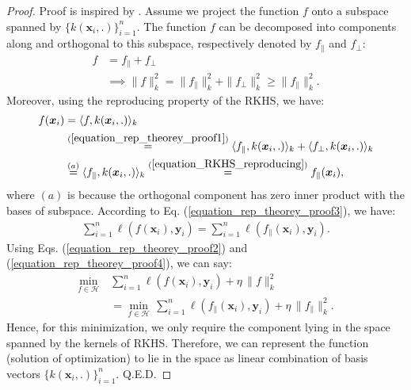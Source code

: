 \documentclass[lang=cn,10pt]{gorgeousnbook}
\numberwithin{equation}{section}%
\numberwithin{figure}{section}%
\begin{document}
\begin{proof}
Proof is inspired by \cite{rudin2012prediction}. 
Assume we project the function $f$ onto a subspace spanned by $\{k(\boldsymbol{x}_i, .)\}_{i=1}^n$. 
The function $f$ can be decomposed into components along and orthogonal to this subspace, respectively denoted by $f_{\|}$ and $f_{\perp}$: 
\begin{align}
f &= f_{\|} + f_{\perp} \label{equation_rep_theorey_proof1} \\
&\implies \|f\|_k^2 = \|f_{\|}\|_k^2 + \|f_{\perp}\|_k^2 \geq \|f_{\|}\|_k^2. \label{equation_rep_theorey_proof2}
\end{align}
Moreover, using the reproducing property of the RKHS, we have:
\begin{align}
f(\boldsymbol{x}_i) &= \langle f, k(\boldsymbol{x}_i, .) \rangle_k \nonumber \\
&\overset{(\ref{equation_rep_theorey_proof1})}{=} \langle f_{\|}, k(\boldsymbol{x}_i, .) \rangle_k + \langle f_{\perp}, k(\boldsymbol{x}_i, .) \rangle_k \nonumber \\
&\overset{(a)}{=} \langle f_{\|}, k(\boldsymbol{x}_i, .) \rangle_k \overset{(\ref{equation_RKHS_reproducing})}{=} f_{\|}(\boldsymbol{x}_i), \label{equation_rep_theorey_proof3}
\end{align}
where $(a)$ is because the orthogonal component has zero inner product with the bases of subspace. 
According to Eq. (\ref{equation_rep_theorey_proof3}), we have:
\begin{align}\label{equation_rep_theorey_proof4}
\sum_{i=1}^n \ell(f(\boldsymbol{x}_i), \boldsymbol{y}_i) = \sum_{i=1}^n \ell(f_{\|}(\boldsymbol{x}_i), \boldsymbol{y}_i).
\end{align}
Using Eqs. (\ref{equation_rep_theorey_proof2}) and (\ref{equation_rep_theorey_proof4}), we can say:
\begin{align*}
\min_{f \in \mathcal{H}}\,& \sum_{i=1}^n \ell(f(\boldsymbol{x}_i), \boldsymbol{y}_i) + \eta\, \|f\|_k^2 \\
&= \min_{f \in \mathcal{H}}\, \sum_{i=1}^n \ell(f_{\|}(\boldsymbol{x}_i), \boldsymbol{y}_i) + \eta\, \|f_{\|}\|_k^2.
\end{align*}
Hence, for this minimization, we only require the component lying in the space spanned by the kernels of RKHS. Therefore, we can represent the function (solution of optimization) to lie in the space as linear combination of basis vectors $\{k(\boldsymbol{x}_i, .)\}_{i=1}^n$. Q.E.D.
\end{proof}
\end{document}
